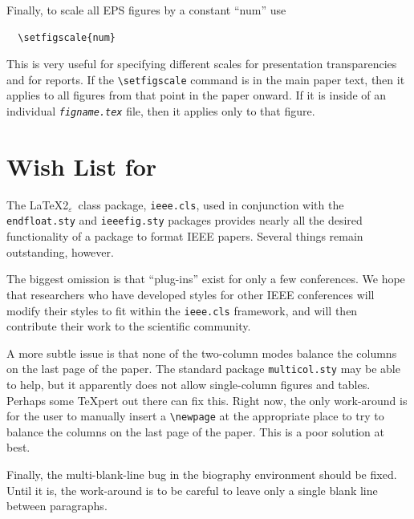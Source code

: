 \documentclass[%
	final,
	notitlepage,
	narroweqnarray,
	inline,
	twoside,
	]{ieee}
\newcommand{\latexiie}{\LaTeX2{\Large$_\varepsilon$}}
\begin{document}
Finally, to scale all EPS figures by a constant ``num'' use
\begin{verbatim}
  \setfigscale{num}
\end{verbatim}
This is very useful for specifying different scales for presentation
transparencies and for reports. If the \verb|\setfigscale| command is
in the main paper text, then it applies to all figures from that point
in the paper onward. If it is inside of an individual
\texttt{\textit{figname.tex\/}} file, then it applies only to that
figure.

\section{Wish List for }

The \latexiie\ class package, \texttt{ieee.cls}, used in conjunction
with the \texttt{endfloat.sty} and \texttt{ieeefig.sty} packages
provides nearly all the desired functionality of a package to format
IEEE papers.  Several things remain outstanding, however.

The biggest omission is that ``plug-ins'' exist for only a few
conferences.  We hope that researchers who have developed styles for
other IEEE conferences will modify their styles to fit within the
\texttt{ieee.cls} framework, and will then contribute their work to
the scientific community.

A more subtle issue is that none of the two-column modes balance the
columns on the last page of the paper. The standard package
\texttt{multicol.sty} may be able to help, but it apparently does not
allow single-column figures and tables. Perhaps some {\TeX}pert out
there can fix this. Right now, the only work-around is for the user to
manually insert a \verb|\newpage| at the appropriate place to try to
balance the columns on the last page of the paper. This is a poor
solution at best.

Finally, the multi-blank-line bug in the biography environment should
be fixed. Until it is, the work-around is to be careful to leave only
a single blank line between paragraphs.

\end{document}
